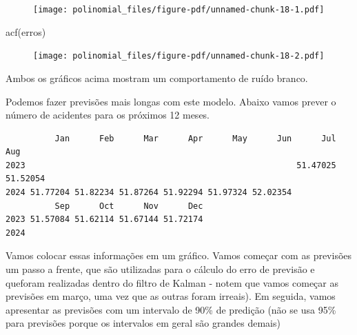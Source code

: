 \documentclass[
  letterpaper,
  DIV=11,
  numbers=noendperiod]{scrreprt}
\newenvironment{Shaded}{\begin{snugshade}}{\end{snugshade}}
\newcommand{\DecValTok}[1]{\textcolor[rgb]{0.68,0.00,0.00}{#1}}
\newcommand{\FunctionTok}[1]{\textcolor[rgb]{0.28,0.35,0.67}{#1}}
\newcommand{\NormalTok}[1]{\textcolor[rgb]{0.00,0.23,0.31}{#1}}
\newcommand{\OtherTok}[1]{\textcolor[rgb]{0.00,0.23,0.31}{#1}}
\newcommand{\SpecialCharTok}[1]{\textcolor[rgb]{0.37,0.37,0.37}{#1}}
\begin{document}
\begin{figure}[H]

{\centering \texttt{[image: polinomial\_files/figure-pdf/unnamed-chunk-18-1.pdf]}

}

\end{figure}

\begin{Shaded}
\begin{Highlighting}[]
\FunctionTok{acf}\NormalTok{(erros)}
\end{Highlighting}
\end{Shaded}

\begin{figure}[H]

{\centering \texttt{[image: polinomial\_files/figure-pdf/unnamed-chunk-18-2.pdf]}

}

\end{figure}

Ambos os gráficos acima mostram um comportamento de ruído branco.

Podemos fazer previsões mais longas com este modelo. Abaixo vamos prever
o número de acidentes para os próximos 12 meses.

\begin{Shaded}
\end{Shaded}

\begin{verbatim}
          Jan      Feb      Mar      Apr      May      Jun      Jul      Aug
2023                                                       51.47025 51.52054
2024 51.77204 51.82234 51.87264 51.92294 51.97324 52.02354                  
          Sep      Oct      Nov      Dec
2023 51.57084 51.62114 51.67144 51.72174
2024                                    
\end{verbatim}

Vamos colocar essas informações em um gráfico. Vamos começar com as
previsões um passo a frente, que são utilizadas para o cálculo do erro
de previsão e queforam realizadas dentro do filtro de Kalman - notem que
vamos começar as previsões em março, uma vez que as outras foram
irreais). Em seguida, vamos apresentar as previsões com um intervalo de
90\% de predição (não se usa 95\% para previsões porque os intervalos em
geral são grandes demais)
\end{document}
